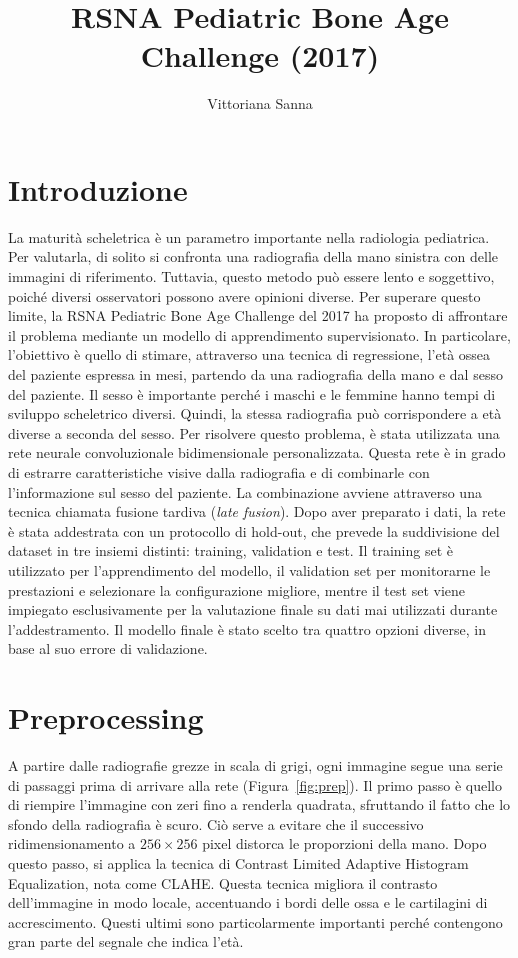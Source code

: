 \documentclass{article}
\title{RSNA Pediatric Bone Age Challenge (2017)}
\author{Vittoriana Sanna}
\date{}
\begin{document}
\maketitle
\vspace{-2em} 

\section{Introduzione}

La maturità scheletrica è un parametro importante nella radiologia pediatrica. Per valutarla, di solito si confronta una radiografia della mano sinistra con delle immagini di riferimento. Tuttavia, questo metodo può essere lento e soggettivo, poiché diversi osservatori possono avere opinioni diverse.
Per superare questo limite, la RSNA \cite{rsna2017} Pediatric Bone Age Challenge del 2017 ha proposto di affrontare il problema mediante un modello di apprendimento supervisionato. In particolare, l'obiettivo è quello di stimare, attraverso una tecnica di regressione, l'età ossea del paziente espressa in mesi, partendo da una radiografia della mano e dal sesso del paziente. Il sesso è importante perché i maschi e le femmine hanno tempi di sviluppo scheletrico diversi. Quindi, la stessa radiografia può corrispondere a età diverse a seconda del sesso.
Per risolvere questo problema, è stata utilizzata una rete neurale convoluzionale bidimensionale personalizzata. Questa rete è in grado di estrarre caratteristiche visive dalla radiografia e di combinarle con l'informazione sul sesso del paziente. La combinazione avviene attraverso una tecnica chiamata fusione tardiva (\emph{late fusion}). Dopo aver preparato i dati, la rete è stata addestrata con un protocollo di hold-out, che prevede la suddivisione del dataset in tre insiemi distinti: training, validation e test. Il training set è utilizzato per l'apprendimento del modello, il validation set per monitorarne le prestazioni e selezionare la configurazione migliore, mentre il test set viene impiegato esclusivamente per la valutazione finale su dati mai utilizzati durante l'addestramento. Il modello finale è stato scelto tra quattro opzioni diverse, in base al suo errore di validazione.

\section{Preprocessing}

A partire dalle radiografie grezze in scala di grigi, ogni immagine segue una serie di passaggi prima di arrivare alla rete (Figura~\ref{fig:prep}). Il primo passo è quello di riempire l'immagine con zeri fino a renderla quadrata, sfruttando il fatto che lo sfondo della radiografia è scuro. Ciò serve a evitare che il successivo ridimensionamento a $256\times256$ pixel distorca le proporzioni della mano.
Dopo questo passo, si applica la tecnica di Contrast Limited Adaptive Histogram Equalization, nota come CLAHE. Questa tecnica migliora il contrasto dell'immagine in modo locale, accentuando i bordi delle ossa e le cartilagini di accrescimento. Questi ultimi sono particolarmente importanti perché contengono gran parte del segnale che indica l'età.
\end{document}
